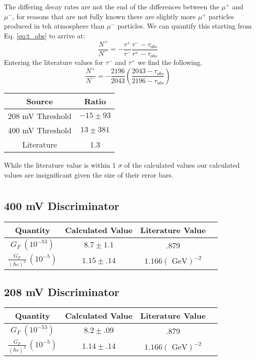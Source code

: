 \documentclass[11pt,letterpaper]{article}
\begin{document}
The differing decay rates are not the end of the differences between the $\mu^+$ and $\mu^-$, for reasons that are not fully known there are slightly more $\mu^+$ particles produced in teh atmosphere than $\mu^-$ particles. We can quantify this starting from Eq. \ref{eq:t_obs} to arrive at:
\begin{equation}
\label{eq:ratio}
    \frac{N^+}{N^-} = -\frac{\tau^+}{\tau^-}\frac{\tau^--\tau_{obs}}{\tau^+-\tau_{obs}}
\end{equation}
Entering the literature values for $\tau^-$ and $\tau^+$ we find the following.
\begin{equation}
\frac{N^+}{N^-} =-\frac{2196}{2043}\left(\frac{2043-\tau_{obs}}{2196-\tau_{obs}}\right)
\end{equation}
\begin{center}
	\begin{tabular}{|c|c|}\hline
		Source & Ratio \\ \hline\hline
		208 mV Threshold &$-15 \pm 93$   \\ \hline
		400 mV Threshold & $13 \pm 381$ \\ \hline
        Literature & 1.3  \\ \hline
	\end{tabular}
\end{center}
While the literature value is within 1 $\sigma$ of the calculated values our calculated values are insignificant given the size of their error bars.
\section{}%
\subsection{400 mV Discriminator}
\begin{center}
	\begin{tabular}{|c|c|c|c|}\hline
		Quantity & Calculated Value & Literature Value\\ \hline\hline
		 $G_F\ (10^{-53})$& $8.7 \pm 1.1 $ & .879  \\ \hline
		$\frac{G_F}{(\hbar c)^3}\ (10^{-5}) $ &$ 1.15 \pm .14 $ &$ 1.166 (\text{ GeV})^{-2}$\\ \hline
	\end{tabular}
\end{center}
\subsection{208 mV Discriminator}
\begin{center}
	\begin{tabular}{|c|c|c|c|}\hline
		Quantity & Calculated Value & Literature Value\\ \hline\hline
		 $G_F\ (10^{-53})$& $8.2 \pm .09 $ & .879  \\ \hline
		$\frac{G_F}{(\hbar c)^3}\ (10^{-5}) $ &$ 1.14 \pm .14 $ &$ 1.166 (\text{ GeV})^{-2}$\\ \hline
	\end{tabular}
\end{center}
\end{document}
